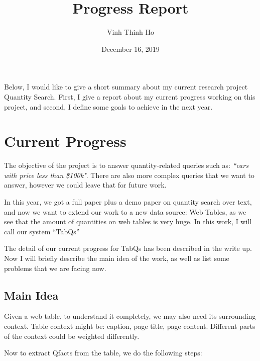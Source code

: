 \documentclass{article}
\title{Progress Report}
\author{Vinh Thinh Ho}
\date{December 16, 2019}
\begin{document}
\maketitle
Below, I would like to give a short summary about my current research project Quantity Search. First, I give a report about my current progress working on this project, and second, I define some goals to achieve in the next year.
\section{Current Progress}
The objective of the project is to answer quantity-related queries such as: \textit{``cars with price less than \$100k"}. There are also more complex queries that we want to answer, however we could leave that for future work. 

In this year, we got a full paper plus a demo paper on quantity search over text, and now we want to extend our work to a new data source: Web Tables, as we see that the amount of quantities on web tables is very huge. In this work, I will call our system ``TabQs'' 

The detail of our current progress for TabQs has been described in the write up. Now I will briefly describe the main idea of the work, as well as list some problems that we are facing now.
\subsection{Main Idea}
Given a web table, to understand it completely, we may also need its surrounding context. Table context might be: caption, page title, page content. Different parts of the context could be weighted differently.

Now to extract Qfacts from the table, we do the following steps:
\end{document}
